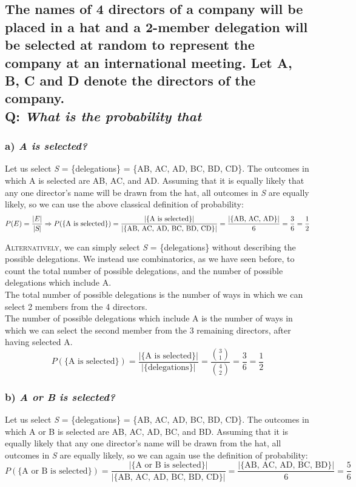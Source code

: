 \documentclass{article}
\begin{document}
\subsection*{{\normalsize The names of 4 directors of a company will be placed in a hat and a 2-member delegation will be selected at random to represent the company at an international meeting. Let A, B, C and D denote the directors of the company.}\\
Q: {\em What is the probability that}}
\subsubsection*{a) {\em A is selected?}}
Let us select \textsl{S} = \{delegations\} = \{AB, AC, AD, BC, BD, CD\}. The outcomes in which A is selected are AB, AC, and AD. Assuming that it is equally likely that any one director's name will be drawn from the hat, all outcomes in \textsl{S} are equally likely, so we can use the above classical definition of probability:
\begin{equation*}
P(E)=\dfrac{|E|}{|\textsl{S}|}\Rightarrow P(\{\text{A is selected}\})=\dfrac{|\{\text{A is selected}\}|}{|\{\text{AB, AC, AD, BC, BD, CD}\}|}=\dfrac{|\{\text{AB, AC, AD}\}|}{6}=\dfrac{3}{6}=\dfrac{1}{2}
\end{equation*}

\textsc{Alternatively}, we can simply select \textsl{S} = \{delegations\} without describing the possible delegations. We instead use combinatorics, as we have seen before, to count the total number of possible delegations, and the number of possible delegations which include A.\\[1ex]
The total number of possible delegations is the number of ways in which we can select 2 members from the 4 directors.\\[1ex]
The number of possible delegations which include A is the number of ways in which we can select the second member from the 3 remaining directors, after having selected A.
\begin{equation*}
P(\{\text{A is selected}\})=\dfrac{|\{\text{A is selected}\}|}{|\{\text{delegations}\}|}=\dfrac{\binom{3}{1}}{\binom{4}{2}}=\dfrac{3}{6}=\dfrac{1}{2}
\end{equation*}

\subsubsection*{b) {\em A or B is selected?}}
Let us select \textsl{S} = \{delegations\} = \{AB, AC, AD, BC, BD, CD\}. The outcomes in which A or B is selected are AB, AC, AD, BC, and BD. Assuming that it is equally likely that any one director's name will be drawn from the hat, all outcomes in \textsl{S} are equally likely, so we can again use the definition of probability:
\begin{equation*}
P(\{\text{A or B is selected}\})=\dfrac{|\{\text{A or B is selected}\}|}{|\{\text{AB, AC, AD, BC, BD, CD}\}|}=\dfrac{|\{\text{AB, AC, AD, BC, BD}\}|}{6}=\dfrac{5}{6}
\end{equation*}
\end{document}
